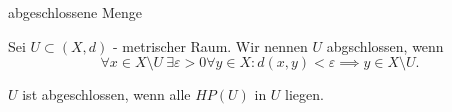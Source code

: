 \documentclass[class=article, crop=false]{standalone}
\begin{document}
\begin{zettel}{abgeschlossene Menge}
\begin{flashcard}
\begin{definition}[abgeschlossen]
    Sei $U \subset (X,d)$ - metrischer Raum.
    Wir nennen $U$ abgschlossen, wenn
\[
    \forall x \in  X \setminus U \  \exists \varepsilon > 0 \forall y \in X : d(x,y) < \varepsilon \implies y \in  X \setminus U
.\]
\end{definition}
\end{flashcard}
$U$ ist abgeschlossen, wenn alle $HP(U)$  in $U$ liegen.

\end{zettel}
\end{document}
